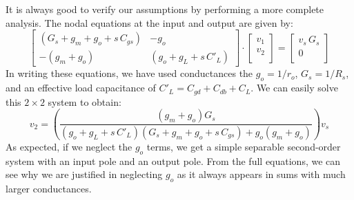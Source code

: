 It is always good to verify our assumptions by performing a more complete analysis.  The nodal equations at the input and output are given by:
    \begin{equation}
        \left[\begin{matrix}
            (G_s + g_m + g_o + s\,C_{gs})  & - g_o\\[0.25cm]
            -(g_m + g_o) & (g_o + g_L + s\,C'_L)
        \end{matrix}\right]
        \cdot
        \left[\begin{matrix}
            v_1\\[0.25cm]
            v_2\\
        \end{matrix}\right]
        =
        \left[\begin{matrix}
            v_s\,G_s\\[0.25cm]
            0\\
        \end{matrix}\right]
    \end{equation}
In writing these equations, we have used conductances the $g_o = 1/r_o$, $G_s = 1/R_s$, and an effective load capacitance of $C'_L = C_{gd} + C_{db} + C_L$.  We can easily solve this $2\times2$ system to obtain:
    \begin{equation}
        v_2 = \left(\frac{(g_m + g_o)G_s}{(g_o + g_L + s\,C'_L)(G_s + g_m + g_o + s\,C_{gs}) + g_o(g_m + g_o)}\right)v_s
    \end{equation}
As expected, if we neglect the $g_o$ terms, we get a simple separable second-order system with an input pole and an output pole.  From the full equations, we can see why we are justified in neglecting $g_o$ as it always appears in sums with much larger conductances.

